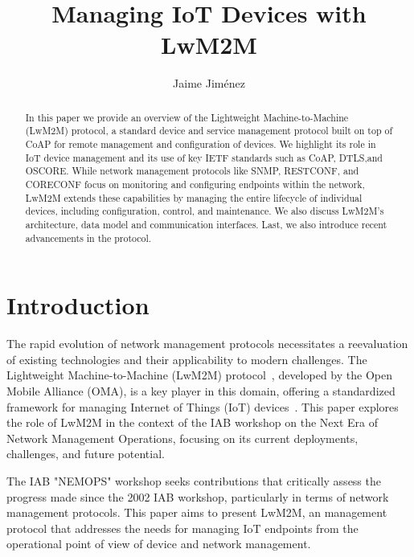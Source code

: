 \documentclass[11pt,sigconf]{iabart}
\begin{document}
\title{Managing IoT Devices with LwM2M}


\author{Jaime Jiménez}

\begin{abstract}

In this paper we provide an overview of the Lightweight Machine-to-Machine (LwM2M) protocol, a standard device and service management protocol built on top of CoAP for remote management and configuration of devices. We highlight its role in IoT device management and its use of key IETF standards such as CoAP, DTLS,and OSCORE. While network management protocols like SNMP, RESTCONF, and CORECONF focus on monitoring and configuring endpoints within the network, LwM2M extends these capabilities by managing the entire lifecycle of individual devices, including configuration, control, and maintenance. We also discuss LwM2M's architecture, data model and communication interfaces. Last, we also introduce recent advancements in the protocol.

\end{abstract}


\maketitle

\section{Introduction} \label{introduction}

The rapid evolution of network management protocols necessitates a reevaluation of existing technologies and their applicability to modern challenges. The Lightweight Machine-to-Machine (LwM2M) protocol~\cite{lwm2m-spec}, developed by the Open Mobile Alliance (OMA), is a key player in this domain, offering a standardized framework for managing Internet of Things (IoT) devices~\cite{oma-sdo}. This paper explores the role of LwM2M in the context of the IAB workshop on the Next Era of Network Management Operations, focusing on its current deployments, challenges, and future potential.

The IAB "NEMOPS" workshop seeks contributions that critically assess the progress made since the 2002 IAB workshop, particularly in terms of network management protocols. This paper aims to present LwM2M, an management protocol that addresses the needs for managing IoT endpoints from the operational point of view of device and network management.
\end{document}
